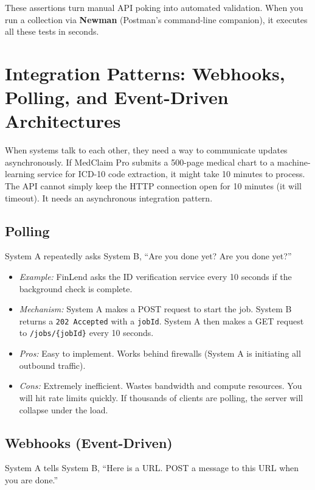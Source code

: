 These assertions turn manual API poking into automated validation. When
you run a collection via \textbf{Newman} (Postman's command-line
companion), it executes all these tests in seconds.

\section{Integration Patterns: Webhooks, Polling, and Event-Driven
Architectures}\label{integration-patterns-webhooks-polling-and-event-driven-architectures}

When systems talk to each other, they need a way to communicate updates
asynchronously. If MedClaim Pro submits a 500-page medical chart to a
machine-learning service for ICD-10 code extraction, it might take 10
minutes to process. The API cannot simply keep the HTTP connection open
for 10 minutes (it will timeout). It needs an asynchronous integration
pattern.

\subsection{Polling}\label{polling}

System A repeatedly asks System B, ``Are you done yet? Are you done
yet?''

\begin{itemize}
\tightlist
\item
  \emph{Example:} FinLend asks the ID verification service every 10
  seconds if the background check is complete.
\item
  \emph{Mechanism:} System A makes a POST request to start the job.
  System B returns a \texttt{202\ Accepted} with a \texttt{jobId}.
  System A then makes a GET request to \texttt{/jobs/\{jobId\}} every 10
  seconds.
\item
  \emph{Pros:} Easy to implement. Works behind firewalls (System A is
  initiating all outbound traffic).
\item
  \emph{Cons:} Extremely inefficient. Wastes bandwidth and compute
  resources. You will hit rate limits quickly. If thousands of clients
  are polling, the server will collapse under the load.
\end{itemize}

\subsection{Webhooks (Event-Driven)}\label{webhooks-event-driven}

System A tells System B, ``Here is a URL. POST a message to this URL
when you are done.''

